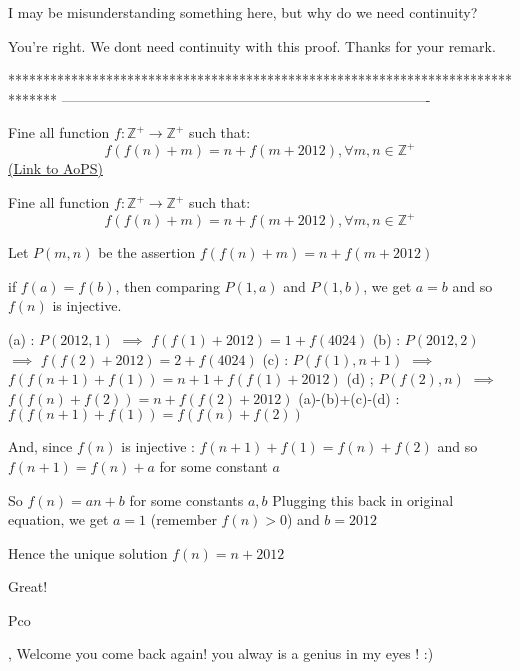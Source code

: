 \begin{solution}
	\begin{tcolorbox}I may be misunderstanding something here, but why do we need continuity?\end{tcolorbox}
You're right. We dont need continuity with this proof.
Thanks for your remark.
\end{solution}
*******************************************************************************
-------------------------------------------------------------------------------

\begin{problem}
	Fine all function $f:\mathbb{Z}^{+} \to \mathbb{Z}^{+}$ such that: \[ f(f(n)+m)=n+f(m+2012), \forall m,n \in \mathbb{Z}^{+}\]
	\flushright \href{https://artofproblemsolving.com/community/c6h526789}{(Link to AoPS)}
\end{problem}



\begin{solution}
	\begin{tcolorbox}Fine all function $f:\mathbb{Z}^{+} \to \mathbb{Z}^{+}$ such that: \[ f(f(n)+m)=n+f(m+2012), \forall m,n \in \mathbb{Z}^{+}\]\end{tcolorbox}
Let $P(m,n)$ be the assertion $f(f(n)+m)=n+f(m+2012)$

if $f(a)=f(b)$, then comparing $P(1,a)$ and $P(1,b)$, we get $a=b$ and so $f(n)$ is injective.

(a) : $P(2012,1)$ $\implies$ $f(f(1)+2012)=1+f(4024)$
(b) : $P(2012,2)$ $\implies$ $f(f(2)+2012)=2+f(4024)$
(c) : $P(f(1),n+1)$ $\implies$ $f(f(n+1)+f(1))=n+1+f(f(1)+2012)$
(d) ; $P(f(2),n)$ $\implies$ $f(f(n)+f(2))=n+f(f(2)+2012)$
(a)-(b)+(c)-(d) : $f(f(n+1)+f(1))=f(f(n)+f(2))$

And, since $f(n)$ is injective : $f(n+1)+f(1)=f(n)+f(2)$ and so $f(n+1)=f(n)+a$ for some constant $a$

So $f(n)=an+b$ for some constants $a,b$
Plugging this back in original equation, we get $a=1$ (remember $f(n)>0$) and $b=2012$

Hence the unique solution $\boxed{f(n)=n+2012}$
\end{solution}



\begin{solution}
	Great! 
\begin{bolded}Pco\end{bolded}, Welcome you come back again! 
you alway is a genius in my eyes ! :)
\end{solution}



